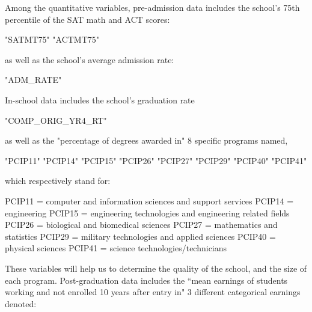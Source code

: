 \documentclass{article}
\begin{document}
Among the quantitative variables, pre-admission data includes the school's 75th percentile of the SAT math and ACT scores:
\begin{Schunk}
\begin{Soutput}
[1] "SATMT75" "ACTMT75"
\end{Soutput}
\end{Schunk}
as well as the school's average admission rate: 
\begin{Schunk}
\begin{Soutput}
[1] "ADM_RATE"
\end{Soutput}
\end{Schunk}
In-school data includes the school's graduation rate 
\begin{Schunk}
\begin{Soutput}
[1] "COMP_ORIG_YR4_RT"
\end{Soutput}
\end{Schunk}
as well as the "percentage of degrees awarded in" 8 specific programs named, 
\begin{Schunk}
\begin{Soutput}
[1] "PCIP11" "PCIP14" "PCIP15" "PCIP26" "PCIP27" "PCIP29" "PCIP40" "PCIP41"
\end{Soutput}
\end{Schunk}
which respectively stand for:
\begin{center}
\begin{flushleft}
PCIP11 = computer and information sciences and support services \newline
PCIP14 = engineering \newline
PCIP15 = engineering technologies and engineering related fields \newline
PCIP26 = biological and biomedical sciences \newline
PCIP27 = mathematics and statistics \newline
PCIP29 = military technologies and applied sciences \newline
PCIP40 = physical sciences \newline
PCIP41 = science technologies/technicians \newline
\end{flushleft}
\end{center}
  These variables will help us to determine the quality of the school, and the size of each program.  Post-graduation data includes the ``mean earnings of students working and not enrolled 10 years after entry in" 3 different categorical earnings denoted:  
\end{document}

